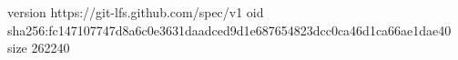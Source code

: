 version https://git-lfs.github.com/spec/v1
oid sha256:fc147107747d8a6c0e3631daadced9d1e687654823dcc0ca46d1ca66ae1dae40
size 262240
